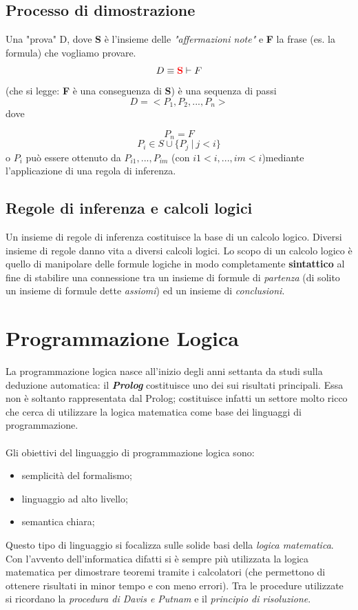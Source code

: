 \documentclass[11pt]{article}
\begin{document}
\subsection{Processo di dimostrazione}
Una "prova" D, dove \color{red}\textbf{S} \color{black} è l'insieme delle \textit{"affermazioni note"} e \textbf{F} la frase (es. la formula) che vogliamo provare.
\begin{equation*}
D\equiv \color{red}\textbf{S}\color{black} \vdash F
\end{equation*} 
(che si legge: \textbf{F} è una conseguenza di \color{red}\textbf{S}\color{black}) è una sequenza di passi $$D = < P_1, P_2, ... , P_n >$$ dove 

$$P_n = F$$  
$$P_i \in S \cup \{P_j \medspace | \medspace j < i\}$$
o $P_i$ può essere ottenuto da $P_{i1},...,P_{im}$ (con $i1 < i, ... , im < i$)mediante l'applicazione di una regola di inferenza.

\subsection{Regole di inferenza e calcoli logici}
Un insieme di regole di inferenza costituisce la base di un calcolo logico. Diversi insieme di regole danno vita a diversi calcoli logici. Lo scopo di un calcolo logico è quello di manipolare delle formule logiche in modo completamente \textbf{sintattico} al fine di stabilire una
connessione tra un insieme di formule di \textit{partenza} (di solito un
insieme di formule dette \emph{assiomi}) ed un insieme di \textit{conclusioni}.

\section{Programmazione Logica}
La programmazione logica nasce all'inizio degli anni settanta da
studi sulla deduzione automatica: il \textit{\textbf{Prolog}} costituisce uno dei
sui risultati principali. Essa non è soltanto rappresentata dal Prolog; costituisce infatti un settore molto ricco che cerca
di utilizzare la logica matematica come base dei linguaggi di
programmazione.
\\ \\ 
Gli obiettivi del linguaggio di programmazione logica sono:
\begin{itemize}
	\item semplicità del formalismo;
	\item linguaggio ad alto livello;
	\item semantica chiara;
\end{itemize}
Questo tipo di linguaggio si focalizza sulle solide basi della \textit{logica matematica}. Con l'avvento dell'informatica difatti si è sempre più utilizzata la logica matematica per dimostrare teoremi tramite i calcolatori (che permettono di ottenere risultati in minor tempo e con meno errori). Tra le procedure utilizzate si ricordano la \textit{procedura di Davis e Putnam} e il \textit{principio di risoluzione}. 
\end{document}
